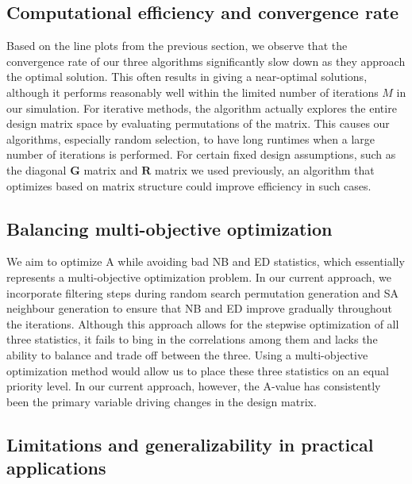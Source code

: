 \documentclass[
  a4paper,
  oneside,
  openany,
  12pt,
  onecolumn]{book}
\theoremstyle{definition}
\theoremstyle{definition}
\theoremstyle{plain}
\theoremstyle{remark}
\begin{document}
\subsection{Computational efficiency and convergence
rate}\label{computational-efficiency-and-convergence-rate}

Based on the line plots from the previous section, we observe that the
convergence rate of our three algorithms significantly slow down as they
approach the optimal solution. This often results in giving a
near-optimal solutions, although it performs reasonably well within the
limited number of iterations \(M\) in our simulation. For iterative
methods, the algorithm actually explores the entire design matrix space
by evaluating permutations of the matrix. This causes our algorithms,
especially random selection, to have long runtimes when a large number
of iterations is performed. For certain fixed design assumptions, such
as the diagonal \(\boldsymbol{G}\) matrix and \(\boldsymbol{R}\) matrix
we used previously, an algorithm that optimizes based on matrix
structure could improve efficiency in such cases.

\subsection{Balancing multi-objective
optimization}\label{balancing-multi-objective-optimization}

We aim to optimize A while avoiding bad NB and ED statistics, which
essentially represents a multi-objective optimization problem. In our
current approach, we incorporate filtering steps during random search
permutation generation and SA neighbour generation to ensure that NB and
ED improve gradually throughout the iterations. Although this approach
allows for the stepwise optimization of all three statistics, it fails
to bing in the correlations among them and lacks the ability to balance
and trade off between the three. Using a multi-objective optimization
method would allow us to place these three statistics on an equal
priority level. In our current approach, however, the A-value has
consistently been the primary variable driving changes in the design
matrix.

\subsection{Limitations and generalizability in practical
applications}\label{limitations-and-generalizability-in-practical-applications}
\end{document}
